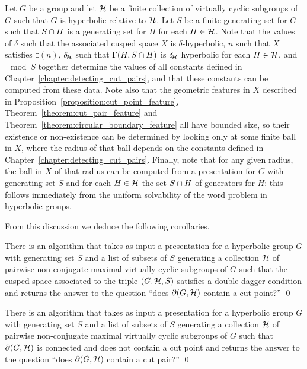 Let $G$ be a group and let $\mathcal{H}$ be a finite collection of virtually cyclic subgroups of $G$ such that $G$ is hyperbolic relative to $\mathcal{H}$.
Let $S$ be a finite generating set for $G$ such that $S \cap H$ is a generating set for $H$ for each $H \in \mathcal{H}$.
Note that the values of $\delta$ such that the associated cusped space $X$ is $\delta$-hyperbolic, $n$ such that $X$ satisfies $\ddag(n)$, $\delta\kern-2pt_{\mathcal{H}}$ such that $\operatorname{\Gamma}(H, S \cap H)$ is $\delta\kern-2pt_{\mathcal{H}}$ hyperbolic for each $H \in \mathcal{H}$, and $\mod{S}$ together determine the values of all constants defined in Chapter~\ref{chapter:detecting_cut_pairs}, and that these constants can be computed from these data.
Note also that the geometric features in $X$ described in Proposition~\ref{proposition:cut_point_feature}, Theorem~\ref{theorem:cut_pair_feature} and Theorem~\ref{theorem:circular_boundary_feature} all have bounded size, so their existence or non-existence can be determined by looking only at some finite ball in $X$, where the radius of that ball depends on the constants defined in Chapter~\ref{chapter:detecting_cut_pairs}.
Finally, note that for any given radius, the ball in $X$ of that radius can be computed from a presentation for $G$ with generating set $S$ and for each $H \in \mathcal{H}$ the set $S \cap H$ of generators for $H$: this follows immediately from the uniform solvability of the word problem in hyperbolic groups. 

From this discussion we deduce the following corollaries.

\begin{corollary}\label{corollary:cut_point_computable} 
 There is an algorithm that takes as input a presentation for a hyperbolic group $G$ with generating set $S$ and a list of subsets of $S$ generating a collection $\mathcal{H}$ of pairwise non-conjugate maximal virtually cyclic subgroups of $G$ such that the cusped space associated to the triple $(G, \mathcal{H}, S)$ satisfies a double dagger condition and returns the answer to the question ``does\/ $\partial(G, \mathcal{H})$ contain a cut point?'' \qed 
\end{corollary}

\begin{corollary}\label{corollary:cut_pair_computable} 
  There is an algorithm that takes as input a presentation for a hyperbolic group $G$ with generating set $S$ and a list of subsets of $S$ generating a collection $\mathcal{H}$ of pairwise non-conjugate maximal virtually cyclic subgroups of $G$ such that $\partial(G, \mathcal{H})$ is connected and does not contain a cut point and returns the answer to the question ``does\/ $\partial(G, \mathcal{H})$ contain a cut pair?'' \qed 
\end{corollary}

